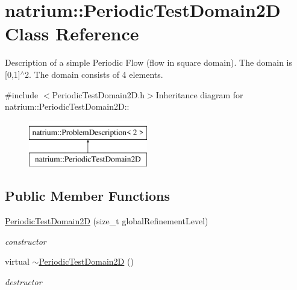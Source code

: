 \hypertarget{classnatrium_1_1PeriodicTestDomain2D}{
\section{natrium::PeriodicTestDomain2D Class Reference}
\label{classnatrium_1_1PeriodicTestDomain2D}
}


Description of a simple Periodic Flow (flow in square domain). The domain is \mbox{[}0,1\mbox{]}$^\wedge$2. The domain consists of 4 elements.  


{\ttfamily \#include $<$PeriodicTestDomain2D.h$>$}Inheritance diagram for natrium::PeriodicTestDomain2D::\begin{figure}[H]
\begin{center}
\leavevmode
\includegraphics[height=2cm]{classnatrium_1_1PeriodicTestDomain2D}
\end{center}
\end{figure}
\subsection*{Public Member Functions}
\begin{DoxyCompactItemize}
\item 
\hyperlink{classnatrium_1_1PeriodicTestDomain2D_a930da37a3e1be744aaf59e27ba956318}{PeriodicTestDomain2D} (size\_\-t globalRefinementLevel)
\begin{DoxyCompactList}\small\item\em constructor \item\end{DoxyCompactList}\item 
\hypertarget{classnatrium_1_1PeriodicTestDomain2D_a81fe3504b294cd4d6219c360f465f84b}{
virtual \hyperlink{classnatrium_1_1PeriodicTestDomain2D_a81fe3504b294cd4d6219c360f465f84b}{$\sim$PeriodicTestDomain2D} ()}
\label{classnatrium_1_1PeriodicTestDomain2D_a81fe3504b294cd4d6219c360f465f84b}

\begin{DoxyCompactList}\small\item\em destructor \item\end{DoxyCompactList}\end{DoxyCompactItemize}


